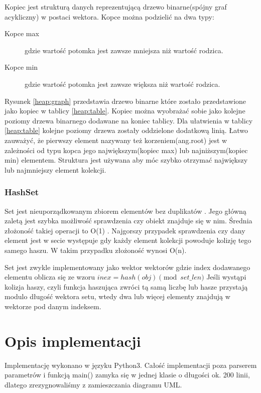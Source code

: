 \documentclass{classrep}
\begin{document}
Kopiec jest strukturą danych reprezentującą drzewo binarne(spójny graf acykliczny) w postaci wektora\cite{STLAlgsVid}.
Kopce można podzielić na dwa typy\cite{IntroToAlgs}:
\begin{description}
    \item [Kopce max] gdzie wartość potomka jest zawsze mniejsza niż wartość rodzica.
    \item [Kopce min] gdzie wartość potomka jest zawsze większa niż wartość rodzica.
\end{description}

Rysunek \ref{heap:graph} przedstawia drzewo binarne które zostało przedstawione jako kopiec w tablicy \ref{heap:table}.
Kopiec można wyobrażać sobie jako kolejne poziomy drzewa binarnego dodawane na koniec tablicy.
Dla ułatwienia w tablicy \ref{heap:table} kolejne poziomy drzewa zostały oddzielone dodatkową linią.
Łatwo zauważyć, że pierwszy element nazywany też korzeniem(ang.root) jest w zależności od typu kopca jego największym(kopiec max) lub najniższym(kopiec min) elementem.
Struktura jest używana aby móc szybko otrzymać największy lub najmniejszy element kolekcji\cite{STLAlgsVid}.
\subsubsection{HashSet}
Set jest nieuporządkowanym zbiorem elementów bez duplikatów \cite{PythonDoc}.
Jego główną zaletą jest szybka możliwość sprawdzenia czy obiekt znajduje się w nim.
Średnia złożoność takiej operacji to O(1) \cite{PythonWiki}.
Najgorszy przypadek sprawdzenia czy dany element jest w secie występuje gdy każdy element kolekcji powoduje kolizję tego samego haszu.
W takim przypadku złożoność wynosi O(n)\cite{PythonWiki}.


Set jest zwykle implementowany jako wektor wektorów gdzie index dodawanego elementu oblicza się ze wzoru $inex = hash(obj) \pmod{set\_len} $
Jeśli wystąpi kolizja haszy, czyli funkcja haszująca zwróci tą samą liczbę lub hasze przystają modulo długość wektora setu, wtedy dwa lub więcej elementy znajdują w wektorze pod danym indeksem.

\section{Opis implementacji}
Implementację wykonano w języku Python3. 
Całość implementacji poza parserem parametrów i funkcją main() zamyka się w jednej klasie o długości ok. 200 linii, dlatego zrezygnowaliśmy z zamieszczania diagramu UML.
\end{document}
